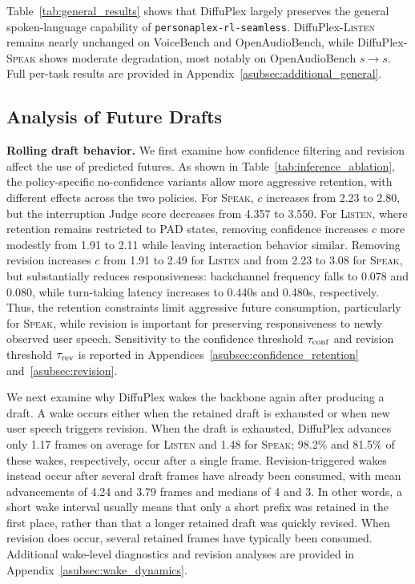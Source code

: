 Table~\ref{tab:general_results} shows that DiffuPlex largely preserves the general spoken-language capability of \texttt{personaplex-rl-seamless}.
DiffuPlex-\textsc{Listen} remains nearly unchanged on
VoiceBench and OpenAudioBench, while DiffuPlex-\textsc{Speak} shows moderate degradation,
most notably on OpenAudioBench $s\!\to\!s$.
Full per-task results are provided in Appendix~\ref{asubsec:additional_general}.


\subsection{Analysis of Future Drafts}
\label{subsec:draft_analysis}


\textbf{Rolling draft behavior.}
We first examine how confidence filtering and revision affect the use of predicted futures.
As shown in Table~\ref{tab:inference_ablation}, the policy-specific no-confidence variants allow more aggressive
retention, with different effects across the two policies.
For \textsc{Speak}, $c$ increases from 2.23 to 2.80, but the interruption Judge score decreases from 4.357 to 3.550.
For \textsc{Listen}, where retention remains restricted to PAD states, removing confidence increases $c$ more modestly from 1.91 to 2.11 while leaving interaction behavior similar.
Removing revision increases $c$ from 1.91 to 2.49 for \textsc{Listen} and from 2.23 to 3.08 for \textsc{Speak}, but substantially reduces responsiveness: backchannel frequency falls to 0.078 and 0.080, while turn-taking latency increases to 0.440s and 0.480s, respectively.
Thus, the retention constraints limit aggressive future consumption, particularly for \textsc{Speak},
while revision is important for preserving responsiveness to newly observed user speech.
Sensitivity to the confidence threshold $\tau_{\rm conf}$ and revision threshold $\tau_{\rm rev}$ is reported in Appendices~\ref{asubsec:confidence_retention} and~\ref{asubsec:revision}.

We next examine why DiffuPlex wakes the backbone again after producing a draft.
A wake occurs either when the retained draft is exhausted or when new user speech triggers revision.
When the draft is exhausted, DiffuPlex advances only 1.17 frames on average for \textsc{Listen} and 1.48 for \textsc{Speak}; 98.2\% and 81.5\% of these wakes, respectively, occur after a single frame.
Revision-triggered wakes instead occur after several draft frames have already been consumed, with mean advancements of 4.24 and 3.79 frames and medians of 4 and 3.
In other words, a short wake interval usually means that only a short prefix was retained in the first place, rather than that a longer retained draft was quickly revised.
When revision does occur, several retained frames have typically been consumed.
Additional wake-level diagnostics and revision analyses are provided in
Appendix~\ref{asubsec:wake_dynamics}.

